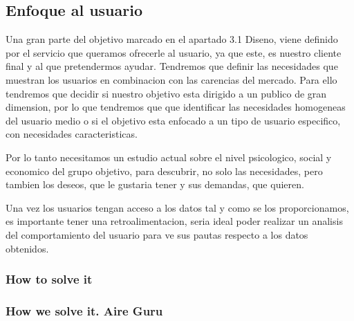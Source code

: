 \subsection{Enfoque al usuario}
Una gran parte del objetivo marcado en el apartado 3.1 Diseno, viene definido por el servicio que queramos ofrecerle
al usuario, ya que este, es nuestro cliente final y al que pretendermos ayudar.
Tendremos que definir las necesidades que muestran los usuarios en combinacion con las carencias del mercado.
Para ello tendremos que decidir si nuestro objetivo esta dirigido a un publico de gran dimension, por lo que tendremos que
que identificar las necesidades homogeneas del usuario medio o si el objetivo esta enfocado a un tipo de usuario
especifico, con necesidades caracteristicas.

Por lo tanto necesitamos un estudio actual sobre el nivel psicologico, social y economico del grupo objetivo, para descubrir, no solo
las necesidades, pero tambien los deseos, que le gustaria tener y sus demandas, que quieren.

Una vez los usuarios tengan acceso a los datos tal y como se los proporcionamos, es importante tener una retroalimentacion, 
seria ideal poder realizar un analisis del comportamiento del usuario para ve sus pautas respecto a los datos obtenidos.

\subsubsection{How to solve it} 


\subsubsection{How we solve it. Aire Guru} 
 
\begin{itemize}
    \done
    \crossed
    
\end{itemize}
 

\newpage